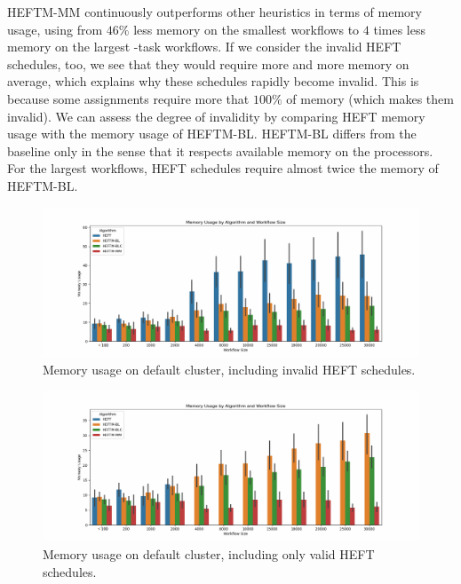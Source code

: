 \documentclass[conference]{IEEEtran}
\newcommand{\algo}[1]{\textsc{#1}}
\newcommand{\heft}{\algo{HEFT}\xspace}
\newcommand{\heftmm}{\algo{HEFTM-MM}\xspace}
\newcommand{\heftbl}{\algo{HEFTM-BL}\xspace}
\begin{document}
    \heftmm continuously outperforms other heuristics in terms of memory usage,
    using from $46\%$ less memory on the smallest
    workflows to $4$ times less memory on the largest -task workflows.
    If we consider the invalid \heft schedules, too, we see that they would require more and more memory on average,
    which explains why these schedules rapidly become invalid.
    This is because some assignments require more that $100\%$ of memory (which makes them invalid).
    We can assess the degree of invalidity by comparing \heft memory usage with the memory usage of \heftbl.
    \heftbl differs from the baseline only in the sense that it respects available memory on the processors.
    For the largest workflows, \heft schedules require almost twice the memory of \heftbl.

    \begin{figure}[tb]
        \centering
        \includegraphics[width=1.1\columnwidth] {images/mem-usage-normal}
        \caption{Memory usage on default cluster, including invalid \heft schedules. }
         \label{fig:mem-usages-normal}
        \vspace{-0.3cm}
    \end{figure}


    \begin{figure}[tb]
        \centering
        \includegraphics[width=1.1\columnwidth] {images/mem-usage-normal-onlyvalid}
        \caption{Memory usage on default cluster, including only valid \heft schedules. }
        \label{fig:mem-usages-onlyvalid}
        \vspace{-0.3cm}
    \end{figure}
\end{document}
